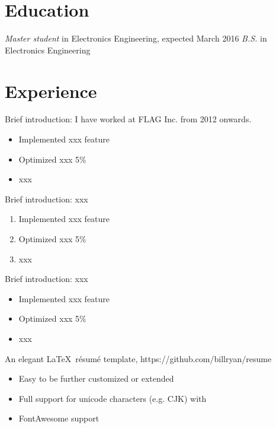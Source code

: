 \documentclass{resume}
\begin{document}


 
\section{Education}
\textit{Master student} in Electronics Engineering, expected March 2016
\textit{B.S.} in Electronics Engineering

\section{Experience}
Brief introduction: I have worked at FLAG Inc. from 2012 onwards.
\begin{itemize}
  \item Implemented xxx feature
  \item Optimized xxx 5\%
  \item xxx
\end{itemize}

Brief introduction: xxx
\begin{enumerate}
  \item Implemented xxx feature
  \item Optimized xxx 5\%
  \item xxx
\end{enumerate}

Brief introduction: xxx
\begin{itemize}
  \item Implemented xxx feature
  \item Optimized xxx 5\%
  \item xxx
\end{itemize}

An elegant \LaTeX\ résumé template, https://github.com/billryan/resume
\begin{itemize}
  \item Easy to be further customized or extended
  \item Full support for unicode characters (e.g. CJK) with \XeTeX\
  \item FontAwesome support
\end{itemize}
\end{document}
